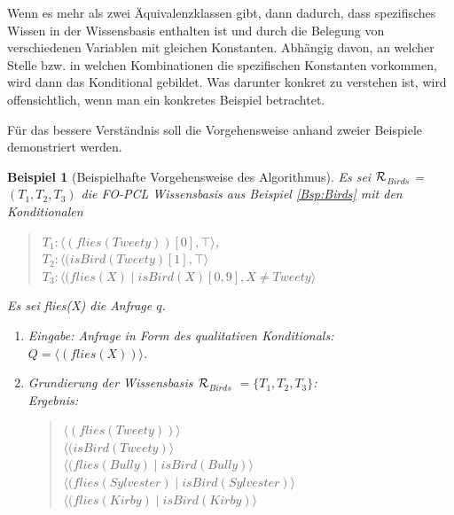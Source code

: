 \documentclass[a4paper, 11pt]{book}
\newtheorem{Bsp}{Beispiel}[section]
\begin{document}
{Wenn es mehr als zwei Äquivalenzklassen gibt, dann dadurch, dass spezifisches Wissen in der Wissensbasis enthalten ist und durch die Belegung von verschiedenen Variablen mit gleichen Konstanten. Abhängig davon, an welcher Stelle bzw. in welchen Kombinationen die spezifischen Konstanten vorkommen, wird dann das Konditional gebildet. Was darunter konkret zu verstehen ist, wird offensichtlich, wenn man ein konkretes Beispiel betrachtet.


Für das bessere Verständnis soll die Vorgehensweise anhand zweier Beispiele demonstriert werden. 
\begin{Bsp}[Beispielhafte Vorgehensweise des Algorithmus]
	
	Es sei  $ \cal{R} $$_{Birds}  $ = $ (T_1, T_2, T_3)  $ die FO-PCL Wissensbasis aus Beispiel \ref{Bsp:Birds} mit den Konditionalen 
	\begin{quote}
		$ T_{1}  :  \langle (flies(Tweety))[0], \top \rangle $,\\
		$ T_{2} : \langle (isBird(Tweety) [1], \top \rangle$\\
		$ T_{3} : \langle (flies(X) \mid isBird(X)[0,9], X \neq Tweety \rangle$\\
	\end{quote}
	Es sei flies(X) die Anfrage $ q $.
	
	\begin{enumerate}
		\item Eingabe: Anfrage in Form des qualitativen Konditionals:\\
		$ Q = \langle (flies(X)) \rangle $.
		\item Grundierung der Wissensbasis $ \cal  R$$_{Birds}  $ $ = \{T_1, T_2, T_3\} $:\\
		Ergebnis:
		\begin{quote}
			$\langle (flies(Tweety))\rangle $\\
			$ \langle (isBird(Tweety) \rangle$ \\
			$  \langle (flies(Bully) \mid isBird(Bully) \rangle$ \\ 
			$\langle (flies(Sylvester) \mid isBird(Sylvester) \rangle$\\
			$ \langle (flies(Kirby) \mid isBird(Kirby) \rangle $\\
		\end{quote}
		

\end{enumerate}
\end{Bsp}}
\end{document}
